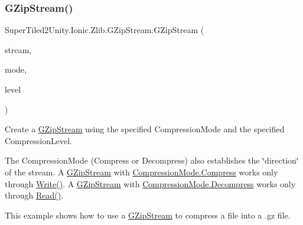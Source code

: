 \subsubsection{\texorpdfstring{G\+Zip\+Stream()}{GZipStream()}\hspace{0.1cm}{\footnotesize\ttfamily [2/4]}}
{\footnotesize\ttfamily Super\+Tiled2\+Unity.\+Ionic.\+Zlib.\+G\+Zip\+Stream.\+G\+Zip\+Stream (\begin{DoxyParamCaption}\item[{Stream}]{stream,  }\item[{\mbox{\hyperlink{namespace_super_tiled2_unity_1_1_ionic_1_1_zlib_ad5b7635d92497e1c905e5de82eb1c6b1}{Compression\+Mode}}}]{mode,  }\item[{\mbox{\hyperlink{namespace_super_tiled2_unity_1_1_ionic_1_1_zlib_a20f6771804996c363f454ad9765cd7db}{Compression\+Level}}}]{level }\end{DoxyParamCaption})}



Create a {\ttfamily \mbox{\hyperlink{class_super_tiled2_unity_1_1_ionic_1_1_zlib_1_1_g_zip_stream}{G\+Zip\+Stream}}} using the specified {\ttfamily Compression\+Mode} and the specified {\ttfamily Compression\+Level}. 

The {\ttfamily Compression\+Mode} (Compress or Decompress) also establishes the \char`\"{}direction\char`\"{} of the stream. A {\ttfamily \mbox{\hyperlink{class_super_tiled2_unity_1_1_ionic_1_1_zlib_1_1_g_zip_stream}{G\+Zip\+Stream}}} with {\ttfamily \mbox{\hyperlink{namespace_super_tiled2_unity_1_1_ionic_1_1_zlib_ad5b7635d92497e1c905e5de82eb1c6b1a8fa4fcfcda70410e089984d5f51ae97d}{Compression\+Mode.\+Compress}}} works only through {\ttfamily \mbox{\hyperlink{class_super_tiled2_unity_1_1_ionic_1_1_zlib_1_1_g_zip_stream_a49032afb5806563236a5d53841abe2b8}{Write()}}}. A {\ttfamily \mbox{\hyperlink{class_super_tiled2_unity_1_1_ionic_1_1_zlib_1_1_g_zip_stream}{G\+Zip\+Stream}}} with {\ttfamily \mbox{\hyperlink{namespace_super_tiled2_unity_1_1_ionic_1_1_zlib_ad5b7635d92497e1c905e5de82eb1c6b1a6d2861192fdf4370bcf95c099be0f2f0}{Compression\+Mode.\+Decompress}}} works only through {\ttfamily \mbox{\hyperlink{class_super_tiled2_unity_1_1_ionic_1_1_zlib_1_1_g_zip_stream_a772b5013a585850ffaf8be4aa7f3dbcf}{Read()}}}. 

This example shows how to use a {\ttfamily \mbox{\hyperlink{class_super_tiled2_unity_1_1_ionic_1_1_zlib_1_1_g_zip_stream}{G\+Zip\+Stream}}} to compress a file into a .gz file.


